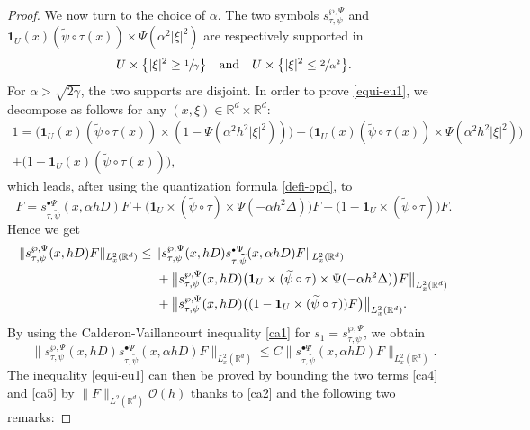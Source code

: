 \documentclass[JEP,XML,SOM,Unicode,NoEqCountersInSection,published]{cedram}
\newcommand{\sbullet}{{\scriptscriptstyle\bullet}}
\theoremstyle{theorem}
\theoremstyle{definition}
\newcommand\R{\mathbb{R}}
\newcommand\pun{\mathbf{1}}
\begin{document}
\begin{proof}
We now turn to the choice of $\alpha$. The two symbols $s_{\tau,\psi}^{\wp,\Psi}$ and $\pun_{U}(x)(\widetilde{\psi}\circ \tau(x))\times \Psi(\alpha^2 |\xi|^2)$ are respectively supported in
\begin{equation*} U\times \bigl\{|\xi|^2\geq \sfrac{1}{\gamma}\bigr\} \quad \text{and} \quad U\times \bigl\{ |\xi|^2 \leq \sfrac{2}{\alpha^2}\bigr\}.
\end{equation*}
For $\alpha>\sqrt{2\gamma}$, the two supports are disjoint.
In order to prove \eqref{equi-eu1}, we decompose as follows for any $(x,\xi)\in \R^d\times \R^d$:
\begin{multline*}
1 = \Big(\pun_{U}(x) (\widetilde{\psi}\circ \tau(x)) \times (1-\Psi(\alpha^2 h^2 |\xi|^2))\Big)+\Big(\pun_{U}(x)
(\widetilde{\psi}\circ \tau(x))\times \Psi(\alpha^2 h^2 |\xi|^2)\Big)\\
+\Big(1-\pun_{U}(x)(\widetilde{\psi}\circ \tau(x)) \Big),
\end{multline*}
which leads, after using the quantization formula \eqref{defi-opd}, to
\begin{equation}\label{ca3}
F= s_{\tau,\widetilde{\psi}}^{\sbullet\Psi}(x,\alpha hD)F + \bigl(\pun_{U}\times (\widetilde{\psi}\circ \tau)\times \Psi(-\alpha h^2 \Delta) \bigr)F 
+ \bigl(1-\pun_{U}\times (\widetilde{\psi}\circ\tau) \bigr)F.
\end{equation}
Hence we get
\begin{align}\nonumber
\|s_{\tau,\psi}^{\wp,\Psi}(x,hD)F\|_{L_x^2(\R^d)} &\leq \|s_{\tau,\psi}^{\wp,\Psi}(x,hD) s_{\tau,\widetilde{\psi}}^{\sbullet\Psi}(x,\alpha h D) F\|_{L_x^2(\R^d)} \\ \label{ca4}
&\hspace*{5mm} + \bigl\| s_{\tau,\psi}^{\wp,\Psi}(x,hD)\bigl(\pun_{U}\times (\widetilde{\psi}\circ \tau)\times \Psi(-\alpha h^2 \Delta)\bigr) F \bigr\|_{L_x^2(\R^d)}\\ \label{ca5}
& \hspace*{5mm}+ \bigl\|s_{\tau,\psi}^{\wp,\Psi}(x,hD)\bigl((1-\pun_{U}\times (\widetilde{\psi}\circ \tau))F\bigl)\bigl\|_{L_x^2(\R^d)}.
\end{align}
By using the Calderon-Vaillancourt inequality \eqref{ca1} for $s_1=s_{\tau,\psi}^{\wp,\Psi}$, we obtain
\begin{equation*}
\|s_{\tau,\psi}^{\wp,\Psi}(x,hD) s_{\tau,\widetilde{\psi}}^{\sbullet\Psi}(x,\alpha h D) F\|_{L_x^2(\R^d)}
\leq C\|s_{\tau,\widetilde{\psi}}^{\sbullet\Psi}(x,\alpha h D) F\|_{L_x^2(\R^d)}.
\end{equation*}
The inequality \eqref{equi-eu1} can then be proved by bounding the two terms \eqref{ca4} and \eqref{ca5} by $\|F\|_{L^2(\R^d)}\mathcal{O}(h)$ thanks to \eqref{ca2} and the following two remarks:

\end{proof}
\end{document}
